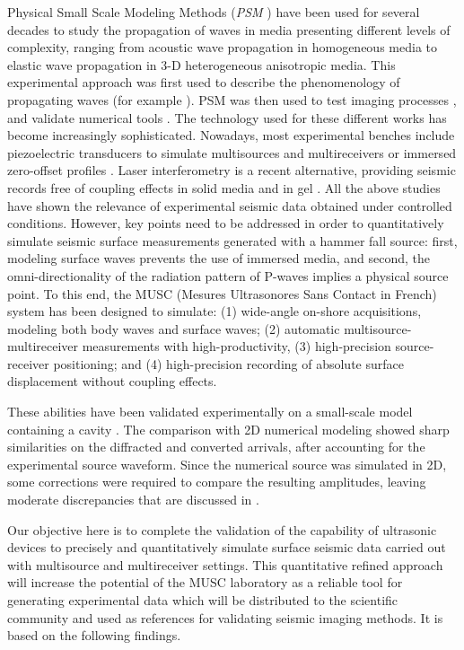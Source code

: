 \documentclass[manuscript,revised]{geophysics}
\newcommand{\psm}{\textit{PSM} }
\newcommand{\thrd}{3-D }
\begin{document}
\noindent Physical Small Scale Modeling Methods (\psm) have been used for several decades to study the propagation of waves in media presenting different levels of complexity, ranging from acoustic wave propagation in homogeneous media to elastic wave propagation in \thrd heterogeneous anisotropic media. This experimental approach was first used to describe the phenomenology of propagating waves (for example \citet{Rieber_EWP_1936,Howes_SMS_1953}). PSM was then used to test imaging processes \citep{Hilterman_TDM_1970,French_MRP_1974,Bishop_LVM_1985,Pratt_FWI_1999}, and validate numerical tools \citep{Favretto_NMT_2013}. The technology used for these different works has become increasingly sophisticated. Nowadays, most experimental benches include piezoelectric transducers to simulate multisources and multireceivers \citep{Wong_SPM_2009} or immersed zero-offset profiles \citep{Favretto_NMT_2013}. Laser interferometry is a recent alternative, providing seismic records free of coupling effects in solid media \citep{_Bodet_2005,_VanWijk_2006,Bretaudeau_SSM_2011,Bretaudeau_FWI_2013} and in gel \citep{_decaqueray_2011} . All the above studies have shown the relevance of experimental seismic data obtained under controlled conditions. However, key points need to be addressed in order to quantitatively simulate seismic surface measurements generated with a hammer fall source: first, modeling surface waves prevents the use of immersed media, and second, the omni-directionality of the radiation pattern of P-waves implies a physical source point. To this end, the MUSC (Mesures Ultrasonores Sans Contact in French) system has been designed \citep{Bretaudeau_SSM_2011} to simulate: (1) wide-angle on-shore acquisitions, modeling both body waves and surface waves; (2) automatic multisource-multireceiver measurements with high-productivity, (3) high-precision source-receiver positioning; and (4) high-precision recording of absolute surface displacement without coupling effects. 

\noindent These abilities have been validated experimentally on a small-scale model containing a cavity \citep{Bretaudeau_SSM_2011}. The comparison with 2D numerical modeling showed sharp similarities on the diffracted and converted arrivals, after accounting for the experimental source waveform. Since the numerical source was simulated in 2D, some corrections were required to compare the resulting amplitudes, leaving moderate discrepancies that are discussed in \citet{Bretaudeau_SSM_2011}. 

\noindent Our objective here is to complete the validation of the capability of ultrasonic devices to precisely and quantitatively simulate surface seismic data carried out with multisource and multireceiver settings. This quantitative refined approach will increase the potential of the MUSC laboratory as a reliable tool for generating experimental data which will be distributed to the scientific community and used as references for validating seismic imaging methods. It is based on the following findings.
\end{document}
